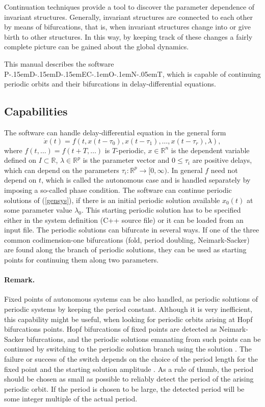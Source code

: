 \documentclass[10pt,a4paper]{ddedoc}
\def\pdde{{P\kern-.15emD\kern-.15emD\kern-.15emE\raisebox{.25ex}{-}C\kern-.1emO\kern-.1emN\kern-.05emT}}
\begin{document}
Continuation techniques provide a tool to discover the parameter dependence of invariant structures. Generally, invariant structures are connected to each other by means of bifurcations, that is, when invariant structures change into or give birth to other structures. In this way, by keeping track of these changes a fairly complete picture can be gained about the global dynamics.

This manual describes the software \pdde, which is capable of continuing periodic orbits and their
bifurcations in delay-differential equations.

\subsection{Capabilities}
\label{capabilities}

The software can handle delay-differential equation in the general form 
\begin{equation}
	\dot{x}(t) = f (t, x(t-\tau_0), x(t - \tau_1), \dots , x(t - \tau_r), \lambda ), \label{gensys}
\end{equation}
where $f(t, \dots ) = f(t + T, \dots)$ is $T$-periodic, $x \in \mathbb{R}^n$ is the dependent variable defined on $I \subset \mathbb{R}$, $\lambda \in \mathbb{R}^p$ is the parameter vector and $0 \le \tau_i$ are positive delays, which can depend on the parameters $\tau_i : \mathbb{R}^p \to [0,\infty)$.
In general $f$ need not depend on $t$, which is called the autonomous case and is handled separately by imposing a so-called phase condition.
The software can continue periodic solutions of (\ref{gensys}), if there is an initial periodic solution available $x_0(t)$ at some parameter value $\lambda_0$. This starting periodic solution has to be specified either in the system definition (C++ source file) or it can be loaded from an input file. The periodic solutions can bifurcate in several ways. If one of the three common codimension-one bifurcations (fold, period doubling, Neimark-Sacker) are found along the branch of periodic solutions, they can be used as starting points for continuing them along two parameters.

\paragraph{Remark.} Fixed points of autonomous systems can be also handled, as periodic solutions of periodic systems by keeping the period constant. Although it is very inefficient, this capability might be useful, when looking for periodic orbits arising at Hopf bifurcations points. Hopf bifurcations of fixed points are detected as Neimark-Sacker bifurcations, and the periodic solutions emanating from such points can be continued by switching to the periodic solution branch using the solution . The failure or success of the switch depends on the choice of the period length for the fixed point and the starting solution amplitude .
As a rule of thumb, the period should be chosen as small as possible to reliably detect the period of the arising periodic orbit. If the period is chosen to be large, the detected period will be some integer multiple of the actual period.
\end{document}

